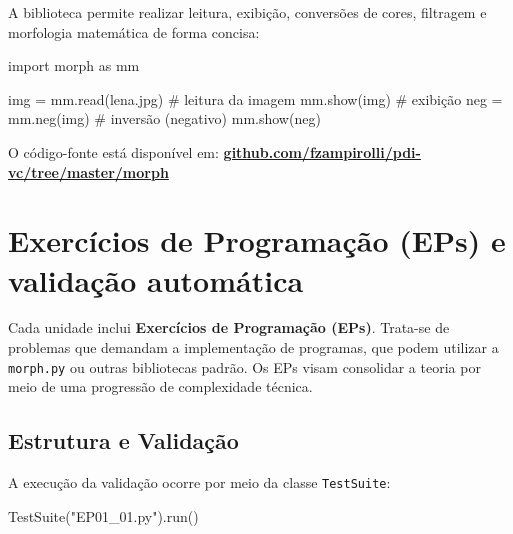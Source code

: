 \documentclass[
  portuguese,
  letterpaper,
  openany,
  oneside,
  12pt,
  a4paper]{book}
\newenvironment{Shaded}{\begin{snugshade}}{\end{snugshade}}
\newcommand{\CommentTok}[1]{\textcolor[rgb]{0.37,0.37,0.37}{#1}}
\newcommand{\ImportTok}[1]{\textcolor[rgb]{0.00,0.46,0.62}{#1}}
\newcommand{\NormalTok}[1]{\textcolor[rgb]{0.00,0.23,0.31}{#1}}
\newcommand{\OperatorTok}[1]{\textcolor[rgb]{0.37,0.37,0.37}{#1}}
\newcommand{\StringTok}[1]{\textcolor[rgb]{0.13,0.47,0.30}{#1}}
\begin{document}
A biblioteca permite realizar leitura, exibição, conversões de cores,
filtragem e morfologia matemática de forma concisa:

\begin{Shaded}
\begin{Highlighting}[]
\ImportTok{import}\NormalTok{ morph }\ImportTok{as}\NormalTok{ mm}

\NormalTok{img }\OperatorTok{=}\NormalTok{ mm.read(}\StringTok{\textquotesingle{}lena.jpg\textquotesingle{}}\NormalTok{)    }\CommentTok{\# leitura da imagem}
\NormalTok{mm.show(img)                 }\CommentTok{\# exibição}
\NormalTok{neg }\OperatorTok{=}\NormalTok{ mm.neg(img)            }\CommentTok{\# inversão (negativo)}
\NormalTok{mm.show(neg)}
\end{Highlighting}
\end{Shaded}

O código-fonte está disponível em:
\textbf{\href{https://github.com/fzampirolli/pdi-vc/tree/master/morph}{github.com/fzampirolli/pdi-vc/tree/master/morph}}

\section*{Exercícios de Programação (EPs) e validação
automática}\label{exercuxedcios-de-programauxe7uxe3o-eps-e-validauxe7uxe3o-automuxe1tica}


Cada unidade inclui \textbf{Exercícios de Programação (EPs)}. Trata-se
de problemas que demandam a implementação de programas, que podem
utilizar a \texttt{morph.py} ou outras bibliotecas padrão. Os EPs visam
consolidar a teoria por meio de uma progressão de complexidade técnica.

\subsection*{Estrutura e Validação}\label{estrutura-e-validauxe7uxe3o}

A execução da validação ocorre por meio da classe \texttt{TestSuite}:

\begin{Shaded}
\begin{Highlighting}[]
\NormalTok{TestSuite(}\StringTok{"EP01\_01.py"}\NormalTok{).run()}
\end{Highlighting}
\end{Shaded}
\end{document}
